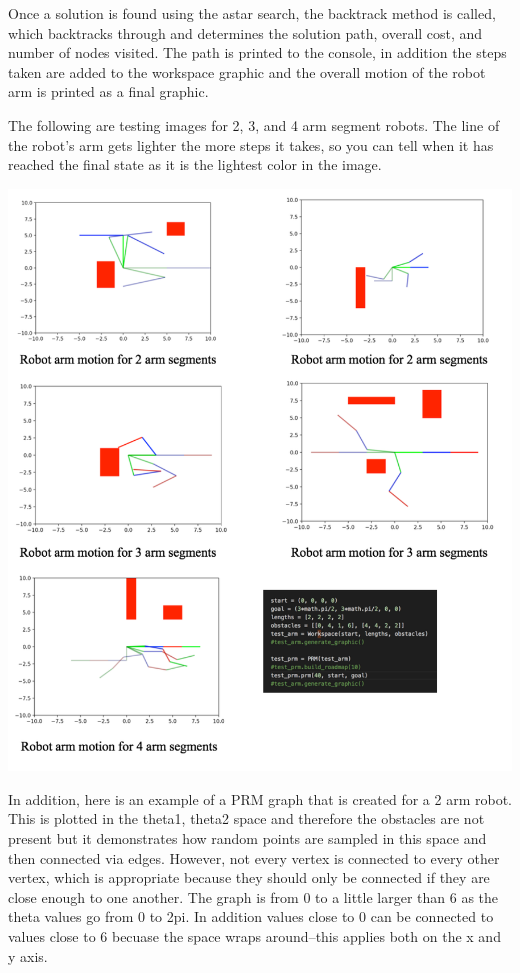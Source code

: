 \documentclass{article}
\begin{document}
Once a solution is found using the astar search, the backtrack method is called, which backtracks through and determines the solution path, overall cost, and number of nodes visited. The path is printed to the console, in addition the steps taken are added to the workspace graphic and the overall motion of the robot arm is printed as a final graphic. 

The following are testing images for 2, 3, and 4 arm segment robots. The line of the robot's arm gets lighter the more steps it takes, so you can tell when it has reached the final state as it is the lightest color in the image. 

\includegraphics[width=\textwidth]{robot_2_3_4_arms.pdf}

In addition, here is an example of a PRM graph that is created for a 2 arm robot. This is plotted in the theta1, theta2 space and therefore the obstacles are not present but it demonstrates how random points are sampled in this space and then connected via edges. However, not every vertex is connected to every other vertex, which is appropriate because they should only be connected if they are close enough to one another. The graph is from 0 to a little larger than 6 as the theta values go from 0 to 2pi. In addition values close to 0 can be connected to values close to 6 becuase the space wraps around--this applies both on the x and y axis. 
\end{document}
